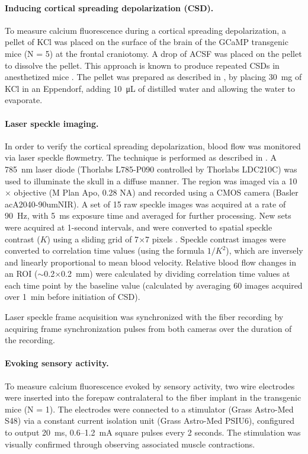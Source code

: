 \paragraph{Inducing cortical spreading depolarization (CSD).} To measure calcium 
fluorescence during a cortical spreading depolarization, a pellet of 
KCl was placed on the surface of the brain of the GCaMP transgenic 
mice (N = 5) at the frontal craniotomy. A drop of ACSF was 
placed on the pellet to dissolve the pellet. This approach is known to
 produce repeated CSDs in anesthetized mice \cite{Karatas:2013ir}. The
 pellet was prepared as described in \cite{Karatas:2013ir}, by placing
 30~mg of KCl in an Eppendorf, adding 10~\si{\micro\liter} of distilled water and 
allowing the water to evaporate.



\paragraph{Laser speckle imaging.} In order to verify the cortical spreading 
depolarization, blood flow was monitored via laser speckle flowmetry. 
The technique is performed as described in 
\cite{Dunn:2001dj,Karatas:2013ir}. A 785~\si{\nano\meter} laser diode 
(Thorlabs L785-P090 controlled by Thorlabs LDC210C) was used to illuminate 
the skull in a diffuse manner. The region was imaged via a 10$\times$ 
objective (M Plan Apo, 0.28 NA) and recorded using a CMOS camera 
(Basler acA2040-90umNIR). A set of 15 raw speckle images was acquired 
at a rate of 90~\si{\hertz}, with 5~ms exposure time and averaged for 
further processing. New sets were acquired at 1-second intervals, and 
were converted to spatial speckle contrast ($K$) using a sliding grid of 
7$\times$7 pixels \cite{Tom:2008hm}. Speckle contrast images were 
converted to correlation time values (using the formula $1/K^2$), which 
are inversely and linearly proportional to mean blood velocity. Relative 
blood flow changes in an ROI ($\sim$0.2$\times$0.2~mm) were calculated 
by dividing correlation time values at each time point by the baseline value 
(calculated by averaging 60 images acquired over 1~min before initiation 
of CSD).

Laser speckle frame acquisition was synchronized with the fiber 
recording by acquiring frame synchronization pulses from both cameras 
over the duration of the recording.



\paragraph{Evoking sensory activity.} To measure calcium fluorescence evoked by 
sensory activity, two wire electrodes were inserted into the forepaw 
contralateral to the fiber implant in the transgenic mice (N = 1). The
 electrodes were connected to a stimulator (Grass Astro-Med S48) via a
 constant current isolation unit (Grass Astro-Med PSIU6), configured 
to output 20~ms, 0.6--1.2~\si{\milli\ampere} square pulses every 2 
seconds. The stimulation was visually confirmed through observing 
associated muscle contractions.



